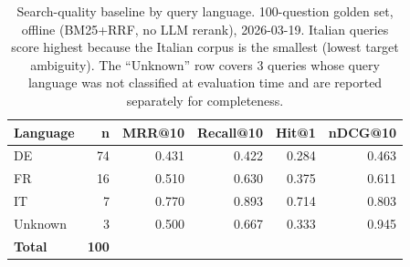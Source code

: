 \begin{table}[t]
\centering
\caption{Search-quality baseline by query language. 100-question golden set, offline (BM25+RRF, no LLM rerank), 2026-03-19. Italian queries score highest because the Italian corpus is the smallest (lowest target ambiguity). The ``Unknown'' row covers 3 queries whose query language was not classified at evaluation time and are reported separately for completeness.}
\label{tab:baseline_by_language}
\small
\begin{tabular}{l r r r r r}
\toprule
\textbf{Language} & \textbf{n} & \textbf{MRR@10} & \textbf{Recall@10} & \textbf{Hit@1} & \textbf{nDCG@10} \\
\midrule
DE       & 74  & 0.431 & 0.422 & 0.284 & 0.463 \\
FR       & 16  & 0.510 & 0.630 & 0.375 & 0.611 \\
IT       &  7  & 0.770 & 0.893 & 0.714 & 0.803 \\
Unknown  &  3  & 0.500 & 0.667 & 0.333 & 0.945 \\
\midrule
\textbf{Total} & \textbf{100} & & & & \\
\bottomrule
\end{tabular}
\end{table}
